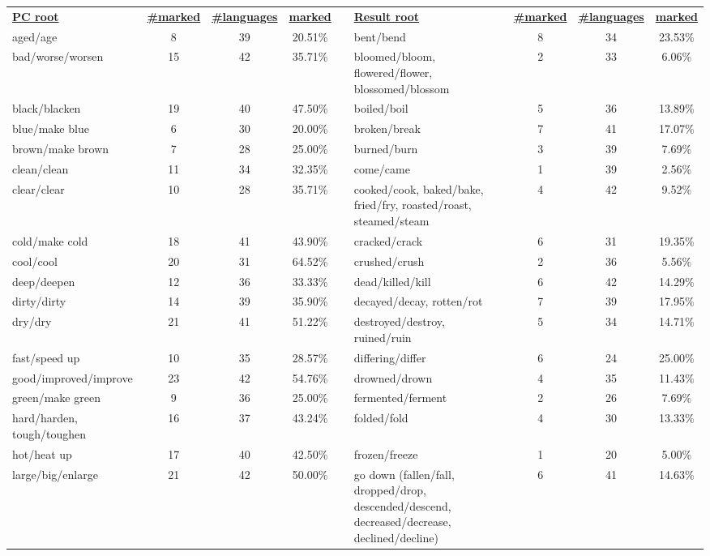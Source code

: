 \begin{tabular}{p{3cm}ccccp{3cm}ccc}
\underline{\textbf{PC root}} & \underline{\textbf{\#marked}} & \underline{\textbf{\#languages}} & \underline{\textbf{marked}} & & \underline{\textbf{Result root}} & \underline{\textbf{\#marked}} & \underline{\textbf{\#languages}} & \underline{\textbf{marked}} \\
aged/age & 8 & 39 & 20.51\% & & bent/bend & 8 & 34 & 23.53\% \\
bad/worse/worsen & 15 & 42 & 35.71\% & & bloomed/bloom, flowered/flower, blossomed/blossom & 2 & 33 & 6.06\% \\
black/blacken & 19 & 40 & 47.50\% & & boiled/boil & 5 & 36 & 13.89\% \\
blue/make blue & 6 & 30 & 20.00\% & & broken/break & 7 & 41 & 17.07\% \\
brown/make brown & 7 & 28 & 25.00\% & & burned/burn & 3 & 39 & 7.69\% \\
clean/clean & 11 & 34 & 32.35\% & & come/came & 1 & 39 & 2.56\% \\
clear/clear & 10 & 28 & 35.71\% & & cooked/cook, baked/bake, fried/fry, roasted/roast, steamed/steam & 4 & 42 & 9.52\% \\
cold/make cold & 18 & 41 & 43.90\% & & cracked/crack & 6 & 31 & 19.35\% \\
cool/cool & 20 & 31 & 64.52\% & & crushed/crush & 2 & 36 & 5.56\% \\
deep/deepen & 12 & 36 & 33.33\% & & dead/killed/kill & 6 & 42 & 14.29\% \\
dirty/dirty & 14 & 39 & 35.90\% & & decayed/decay, rotten/rot & 7 & 39 & 17.95\% \\
dry/dry & 21 & 41 & 51.22\% & & destroyed/destroy, ruined/ruin & 5 & 34 & 14.71\% \\
fast/speed up & 10 & 35 & 28.57\% & & differing/differ & 6 & 24 & 25.00\% \\
good/improved/improve & 23 & 42 & 54.76\% & & drowned/drown & 4 & 35 & 11.43\% \\
green/make green & 9 & 36 & 25.00\% & & fermented/ferment & 2 & 26 & 7.69\% \\
hard/harden, tough/toughen & 16 & 37 & 43.24\% & & folded/fold & 4 & 30 & 13.33\% \\
hot/heat up & 17 & 40 & 42.50\% & & frozen/freeze & 1 & 20 & 5.00\% \\
large/big/enlarge & 21 & 42 & 50.00\% & & go down (fallen/fall, dropped/drop, descended/descend, decreased/decrease, declined/decline) & 6 & 41 & 14.63\% \\

\end{tabular}
